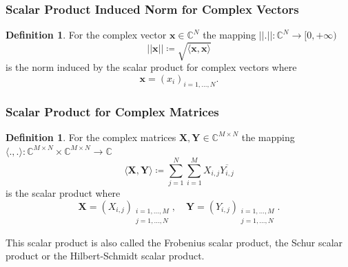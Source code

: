 \documentclass{beamer}
\theoremstyle{definition}
\newtheorem {Def} [Thm]{Definition}
\theoremstyle{remark}
\begin{document}
\begin{frame}
  \frametitle{Scalar Product Induced Norm for Complex Vectors}
  \begin{Def}\label{def:scalar_product_induced_norm_complex_vectors}
    For the complex vector $\boldsymbol{x} \in \mathbb{C}^N$ the mapping  $\left|\left|\boldsymbol{.}\right|\right| \colon \mathbb{C}^N \to [0,+\infty)$ 
    \begin{equation}
        \left|\left|\boldsymbol{x}\right|\right| \coloneqq  \sqrt{\langle\boldsymbol{x},\boldsymbol{x}\rangle}
    \end{equation}
    is the norm induced by the scalar product for complex vectors where
    \begin{equation}
        \boldsymbol{x} = \left(x_i\right)_{i=1,\ldots,N}.
    \end{equation}    
\end{Def}
\end{frame}


\begin{frame}
  \frametitle{Scalar Product for Complex Matrices}
\begin{Def}\label{def:scalar_product_induced_norm_complex_matrices}
    For the complex matrices $\boldsymbol{X},\boldsymbol{Y} \in \mathbb{C}^{M \times N}$ the mapping $\langle\boldsymbol{.},\boldsymbol{.}\rangle \colon \mathbb{C}^{M \times N} \times \mathbb{C}^{M \times N} \to \mathbb{C}$ 
    \begin{equation}
        \langle\boldsymbol{X},\boldsymbol{Y}\rangle \coloneqq \sum_{j=1}^{N}\sum_{i=1}^{M} X_{i,j} \overline{Y_{i,j}} 
    \end{equation}
    is the scalar product where
    \begin{equation}
        \boldsymbol{X} = \left(X_{i,j}\right)_{\substack{i=1,\ldots,M\\ j=1,\ldots,N}}, \quad \boldsymbol{Y} = \left(Y_{i,j}\right)_{\substack{i=1,\ldots,M\\ j=1,\ldots,N}}.
    \end{equation}    
\end{Def}
\noindent This scalar product is also called the Frobenius scalar product, the Schur scalar product or 
the Hilbert-Schmidt scalar product.

\end{frame}
\end{document}
